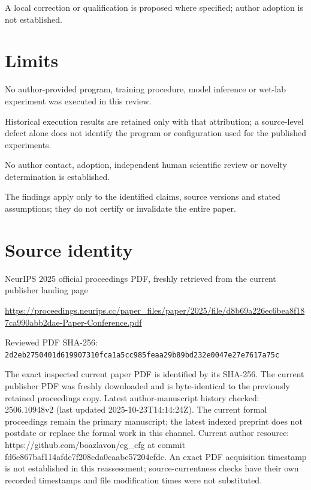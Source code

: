 \documentclass[11pt]{article}
\begin{document}
A local correction or qualification is proposed where specified; author adoption is not established.

\section*{Limits}

No author-provided program, training procedure, model inference or wet-lab experiment was executed in this review.\par

Historical execution results are retained only with that attribution; a source-level defect alone does not identify the program or configuration used for the published experiments.\par

No author contact, adoption, independent human scientific review or novelty determination is established.\par

The findings apply only to the identified claims, source versions and stated assumptions; they do not certify or invalidate the entire paper.\par

\section*{Source identity}

NeurIPS 2025 official proceedings PDF, freshly retrieved from the current publisher landing page

\url{https://proceedings.neurips.cc/paper_files/paper/2025/file/d8b69a226ec6bea8f187ca990abb2dae-Paper-Conference.pdf}

Reviewed PDF SHA-256: \nolinkurl{2d2eb2750401d619907310fca1a5cc985feaa29b89bd232e0047e27e7617a75c}

The exact inspected current paper PDF is identified by its SHA-256. The current publisher PDF was freshly downloaded and is byte-identical to the previously retained proceedings copy. Latest author-manuscript history checked: 2506.10948v2 (last updated 2025-10-23T14:14:24Z). The current formal proceedings remain the primary manuscript; the latest indexed preprint does not postdate or replace the formal work in this channel. Current author resource: https://github.com/boazlavon/eg\_cfg at commit fd6e867baf114afde7f208cda0caabc57204cfdc.  An exact PDF acquisition timestamp is not established in this reassessment; source-currentness checks have their own recorded timestamps and file modification times were not substituted.
\end{document}
